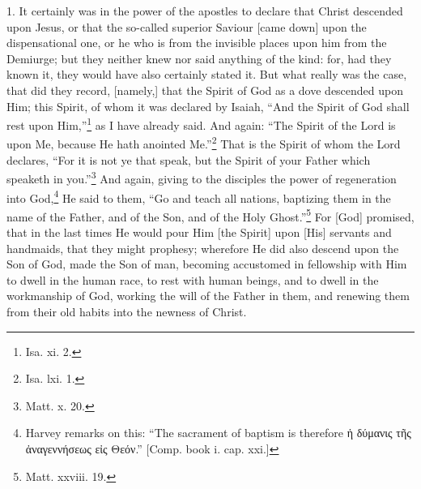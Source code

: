 
1. It certainly was in the power of the apostles to declare that Christ descended upon Jesus, or that the so-called superior Saviour [came down] upon the dispensational one, or he who is from the invisible places upon him from the Demiurge; but they neither knew nor said anything of the kind: for, had they known it, they would have also certainly stated it. But what really was the case, that did they record, [namely,] that the Spirit of God as a dove descended upon Him; this Spirit, of whom it was declared by Isaiah, “And the Spirit of God shall rest upon Him,”\footnote{Isa. xi. 2.} as I have already said. And again: “The Spirit of the Lord is upon Me, because He hath anointed Me.”\footnote{Isa. lxi. 1.} That is the Spirit of whom the Lord declares, “For it is not ye that speak, but the Spirit of your Father which speaketh in you.”\footnote{Matt. x. 20.} And again, giving to the disciples the power of regeneration into God,\footnote{Harvey remarks on this: “The sacrament of baptism is therefore \textgreek{ἡ δύμανις τῆς ἀναγεννήσεως εἰς Θεόν}.” [Comp. book i. cap. xxi.]} He said to them, “Go and teach all nations, baptizing them in the name of the Father, and of the Son, and of the Holy Ghost.”\footnote{Matt. xxviii. 19.} For [God] promised, that in the last times He would pour Him [the Spirit] upon [His] servants and handmaids, that they might prophesy; wherefore He did also descend upon the Son of God, made the Son of man, becoming accustomed in fellowship with Him to dwell in the human race, to rest with human beings, and to dwell in the workmanship of God, working the will of the Father in them, and renewing them from their old habits into the newness of Christ.

